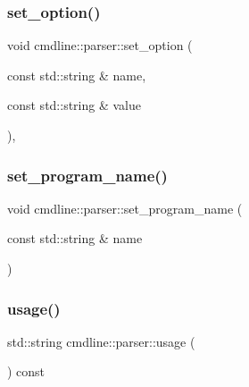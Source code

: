 \mbox{\label{classcmdline_1_1parser_ab43ce046c972a052c89cd9caaabd4327}} 
\subsubsection{\texorpdfstring{set\_option()}{set\_option()}\hspace{0.1cm}{\footnotesize\ttfamily [2/2]}}
{\footnotesize\ttfamily void cmdline\+::parser\+::set\+\_\+option (\begin{DoxyParamCaption}\item[{const std\+::string \&}]{name,  }\item[{const std\+::string \&}]{value }\end{DoxyParamCaption})\hspace{0.3cm}{\ttfamily [inline]}, {\ttfamily [private]}}

\mbox{\label{classcmdline_1_1parser_afdf4cb8deaead2d735c7803ede5b6b6a}} 
\subsubsection{\texorpdfstring{set\_program\_name()}{set\_program\_name()}}
{\footnotesize\ttfamily void cmdline\+::parser\+::set\+\_\+program\+\_\+name (\begin{DoxyParamCaption}\item[{const std\+::string \&}]{name }\end{DoxyParamCaption})\hspace{0.3cm}{\ttfamily [inline]}}

\mbox{\label{classcmdline_1_1parser_a50b57c8179fe1b0dd8f5d2b8e8f3261b}} 
\subsubsection{\texorpdfstring{usage()}{usage()}}
{\footnotesize\ttfamily std\+::string cmdline\+::parser\+::usage (\begin{DoxyParamCaption}{ }\end{DoxyParamCaption}) const\hspace{0.3cm}{\ttfamily [inline]}}



